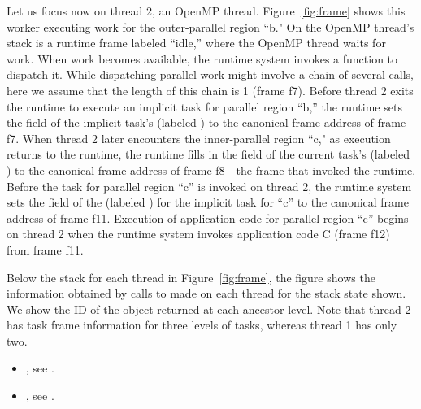 Let us focus now on thread 2, an OpenMP thread. Figure~\ref{fig:frame}
shows this worker executing work for the outer-parallel region ``b."
On the OpenMP thread's stack is a runtime frame labeled ``idle,''
where the OpenMP thread waits for work.  When work becomes available,
the runtime system invokes a function to dispatch it. While
dispatching parallel work might involve a chain of several calls, here
we assume that the length of this chain is 1 (frame f7).  Before
thread 2 exits the runtime to execute an implicit task for parallel
region ``b,'' the runtime sets the  field of the
implicit task's  (labeled ) to the canonical frame address of frame f7.
When thread 2 later encounters the inner-parallel region ``c," as
execution returns to the runtime, the runtime fills in the
 field of the current task's 
(labeled ) to the canonical frame address of frame f8---the frame that invoked the
runtime. Before the task for parallel region ``c'' is invoked on
thread 2, the runtime system sets the  field of the
 (labeled ) for the implicit task for
``c'' to the canonical frame address of frame f11. Execution of application code for parallel region
``c'' begins on thread 2 when the runtime system invokes application
code C (frame f12) from frame f11.


Below the stack for each thread in Figure~\ref{fig:frame}, the figure
shows the  information obtained by calls to
 made on each thread for the stack state
shown. We show the ID of the  object returned at
each ancestor level. Note that thread 2 has task frame information for
three levels of tasks, whereas thread 1 has only two.

\crossreferences
\begin{itemize}
\item {}, see .\
\item {}, see .
\end{itemize}



